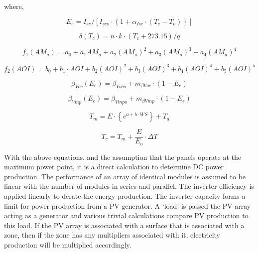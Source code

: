 where,

\begin{equation}
{E_e} = {I_{sc}}/\left[ {{I_{sco}} \cdot \left\{ {1 + {\alpha_{Isc}} \cdot ({T_c} - {T_o})} \right\}} \right]
\end{equation}

\begin{equation}
\delta ({T_c}) = n \cdot k \cdot ({T_c} + 273.15)/q
\end{equation}

\begin{equation}
{f_1}\left( {A{M_a}} \right) = {a_0} + {a_1}A{M_a} + {a_2}{\left( {A{M_a}} \right)^2} + {a_3}{\left( {A{M_a}} \right)^3} + {a_4}{\left( {A{M_a}} \right)^4}
\end{equation}

\begin{equation}
{f_2}\left( {AOI} \right) = {b_0} + {b_1} \cdot AOI + {b_2}{\left( {AOI} \right)^2} + {b_3}{\left( {AOI} \right)^3} + {b_4}{\left( {AOI} \right)^4} + {b_5}{\left( {AOI} \right)^5}
\end{equation}

\begin{equation}
{\beta_{Voc}}({E_e}) = {\beta_{Voco}} + {m_{\beta Voc}} \cdot (1 - {E_e})
\end{equation}

\begin{equation}
{\beta_{Vmp}}({E_e}) = {\beta_{Vmpo}} + {m_{\beta Vmp}} \cdot (1 - {E_e})
\end{equation}

\begin{equation}
{T_m} = E \cdot \left\{ {{e^{a + b \cdot WS}}} \right\} + {T_a}
\end{equation}

\begin{equation}
{T_c} = {T_m} + \frac{E}{{{E_o}}} \cdot \Delta T
\end{equation}

With the above equations, and the assumption that the panels operate at the maximum power point, it is a direct calculation to determine DC power production. The performance of an array of identical modules is assumed to be linear with the number of modules in series and parallel. The inverter efficiency is applied linearly to derate the energy production. The inverter capacity forms a limit for power production from a PV generator. A `load' is passed the PV array acting as a generator and various trivial calculations compare PV production to this load. If the PV array is associated with a surface that is associated with a zone, then if the zone has any multipliers associated with it, electricity production will be multiplied accordingly.

